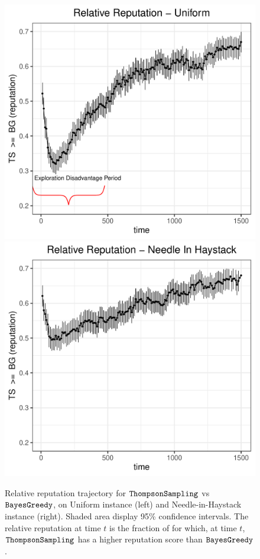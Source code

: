\documentclass[../competing_bandits.tex]{subfiles}
\begin{document}
\begin{figure}[ht]
\centering
\includegraphics[scale=0.35]{ec19paper/figures/relative_uniform_annotated_plot}
\includegraphics[scale=0.35]{ec19paper/figures/relative_nih_ts_dg}
\caption{\footnotesize Relative reputation trajectory for $\mathtt{ThompsonSampling}$ vs $\mathtt{BayesGreedy}$, on Uniform instance (left) and Needle-in-Haystack instance (right). Shaded area display 95\% confidence intervals. The relative reputation at time $t$ is the fraction of \MRVs for which, at time $t$, $\mathtt{ThompsonSampling}$ has a higher reputation score than $\mathtt{BayesGreedy}$.}
\label{relative_rep_plots}
\end{figure}
\end{document}
